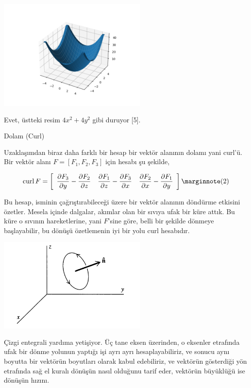 \documentclass[12pt,fleqn]{article}\usepackage{../../common}
\begin{document}
\includegraphics[width=20em]{calc_multi_70_div_curl_lap_02.png}

Evet, üstteki resim $4 x^2 + 4 y^2$ gibi duruyor [5].

Dolam (Curl)

Uzaklaşımdan biraz daha farklı bir hesap bir vektör alanının dolamı yani
curl'ü. Bir vektör alanı $F = [F_1,F_2,F_3]$ için hesabı şu şekilde,

$$
\curl F = \left[\begin{array}{ccc} 
\dfrac{\partial F_3}{\partial y} - \dfrac{\partial F_2}{\partial z} & 
\dfrac{\partial F_1}{\partial z} - \dfrac{\partial F_3}{\partial x} & 
\dfrac{\partial F_2}{\partial x} - \dfrac{\partial F_1}{\partial y} 
\end{array}\right]
\mlabel{2}
$$

Bu hesap, isminin çağrıştırabileceği üzere bir vektör alanının döndürme etkisini
özetler. Mesela içinde dalgalar, akımlar olan bir sıvıya ufak bir küre attık. Bu
küre o sıvının hareketlerine, yani $F$'sine göre, belli bir şekilde dönmeye
başlayabilir, bu dönüşü özetlemenin iyi bir yolu curl hesabıdır.

\includegraphics[width=20em]{calc_multi_70_div_curl_lap_06.png}

Çizgi entegrali yardıma yetişiyor. Üç tane eksen üzerinden, o eksenler etrafında
ufak bir dönme yolunun yaptığı işi ayrı ayrı hesaplayabiliriz, ve sonucu aynı
boyutta bir vektörün boyutları olarak kabul edebiliriz, ve vektörün gösterdiği
yön etrafında sağ el kuralı dönüşün nasıl olduğunu tarif eder, vektörün
büyüklüğü ise dönüşün hızını. 
\end{document}
